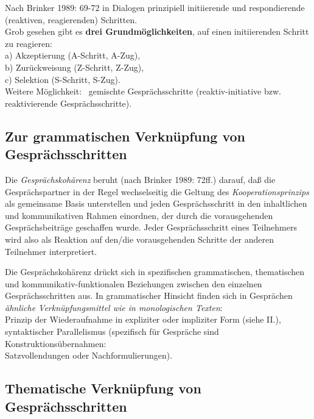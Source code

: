 \documentclass[
  letterpaper,
]{scrbook}
\begin{document}
Nach Brinker 1989: 69-72 in Dialogen prinzipiell initiierende und
respondierende (reaktiven, reagierenden) Schritten.\\

Grob gesehen gibt es \textbf{drei Grundmöglichkeiten}, auf einen
initiierenden Schritt zu reagieren:\\
a) Akzeptierung (A-Schritt, A-Zug),\\
b) Zurückweisung (Z-Schritt, Z-Zug),\\
c) Selektion (S-Schritt, S-Zug).\\

Weitere Möglichkeit: ~gemischte Gesprächsschritte (reaktiv-initiative
bzw. reaktivierende Gesprächsschritte).\\

\hypertarget{zur-grammatischen-verknuxfcpfung-von-gespruxe4chsschritten}{%
\subsection{Zur grammatischen Verknüpfung von
Gesprächsschritten}\label{zur-grammatischen-verknuxfcpfung-von-gespruxe4chsschritten}}

Die \emph{Gesprächskohärenz} beruht (nach Brinker 1989: 72ff.) darauf,
daß die Gesprächspartner in der Regel wechselseitig die Geltung des
\emph{Kooperationsprinzips} als gemeinsame Basis unterstellen und jeden
Gesprächsschritt in den inhaltlichen und kommunikativen Rahmen
einordnen, der durch die vorausgehenden Gesprächsbeiträge geschaffen
wurde. Jeder Gesprächsschritt eines Teilnehmers wird also als Reaktion
auf den/die vorausgehenden Schritte der anderen Teilnehmer
interpretiert.

Die Gesprächskohärenz drückt sich in spezifischen grammatischen,
thematischen und kommunikativ-funktionalen Beziehungen zwischen den
einzelnen Gesprächsschritten aus. In grammatischer Hinsicht finden sich
in Gesprächen \emph{ähnliche Verknüpfungsmittel wie in monologischen
Texten}:\\
Prinzip der Wiederaufnahme in expliziter oder impliziter Form (siehe
II.),\\
syntaktischer Parallelismus (spezifisch für Gespräche sind
Konstruktionsübernahmen:\\
Satzvollendungen oder Nachformulierungen).\\

\hypertarget{thematische-verknuxfcpfung-von-gespruxe4chsschritten}{%
\subsection{Thematische Verknüpfung von
Gesprächsschritten}\label{thematische-verknuxfcpfung-von-gespruxe4chsschritten}}
\end{document}
